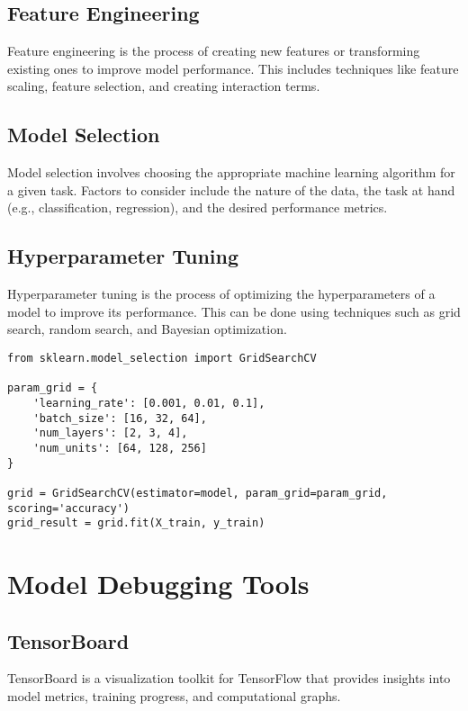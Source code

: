 \subsection{Feature Engineering}
Feature engineering is the process of creating new features or transforming existing ones to improve model performance. This includes techniques like feature scaling, feature selection, and creating interaction terms.

\subsection{Model Selection}
Model selection involves choosing the appropriate machine learning algorithm for a given task. Factors to consider include the nature of the data, the task at hand (e.g., classification, regression), and the desired performance metrics.

\subsection{Hyperparameter Tuning}
Hyperparameter tuning is the process of optimizing the hyperparameters of a model to improve its performance. This can be done using techniques such as grid search, random search, and Bayesian optimization.

\begin{verbatim}
from sklearn.model_selection import GridSearchCV

param_grid = {
    'learning_rate': [0.001, 0.01, 0.1],
    'batch_size': [16, 32, 64],
    'num_layers': [2, 3, 4],
    'num_units': [64, 128, 256]
}

grid = GridSearchCV(estimator=model, param_grid=param_grid, scoring='accuracy')
grid_result = grid.fit(X_train, y_train)
\end{verbatim}

\section{Model Debugging Tools}

\subsection{TensorBoard}
TensorBoard is a visualization toolkit for TensorFlow that provides insights into model metrics, training progress, and computational graphs.

